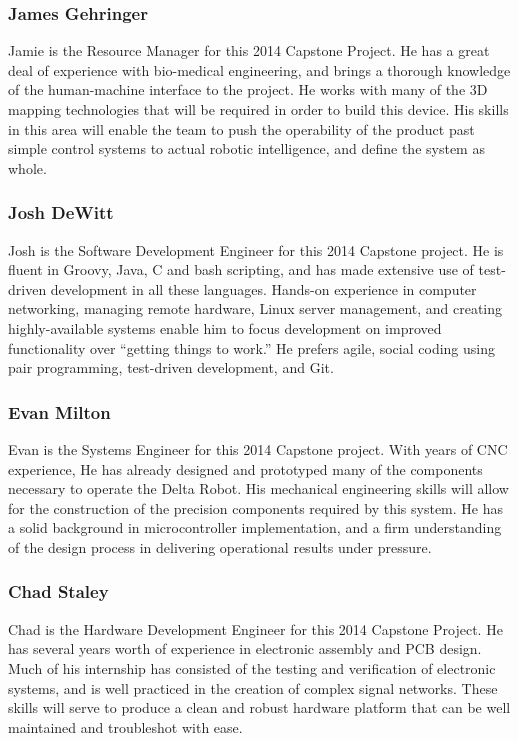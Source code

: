 \documentclass[11pt]{report}
\begin{document}
\subsubsection{James Gehringer}
\par Jamie is the Resource Manager for this 2014 Capstone Project. He has a great deal of experience with bio-medical engineering, and brings a thorough knowledge of the human-machine interface to the project. He works with many of the 3D mapping technologies that will be required in order to build this device. His skills in this area will enable the team to push the operability of the product past simple control systems to actual robotic intelligence, and define the system as whole.

\subsubsection{Josh DeWitt}
\par Josh is the Software Development Engineer for this 2014 Capstone project. He is fluent in Groovy, Java, C and bash scripting, and has made extensive use of test-driven development in all these languages. Hands-on experience in computer networking, managing remote hardware, Linux server management, and creating highly-available systems enable him to focus development on improved functionality over “getting things to work.” He prefers agile, social coding using pair programming, test-driven development, and Git. 

\subsubsection{Evan Milton}
\par Evan is the Systems Engineer for this 2014 Capstone project. With years of CNC experience, He has already designed and prototyped many of the components necessary to operate the Delta Robot. His mechanical engineering skills will allow for the construction of the precision components required by this system. He has a solid background in microcontroller implementation, and a firm understanding of the design process in delivering operational results under pressure.

\subsubsection{Chad Staley}
\par Chad is the Hardware Development Engineer for this 2014 Capstone Project. He has several years worth of experience in electronic assembly and PCB design. Much of his internship has consisted of the testing and verification of electronic systems, and is well practiced in the creation of complex signal networks. These skills will serve to produce a clean and robust hardware platform that can be well maintained and troubleshot with ease.
\end{document}
